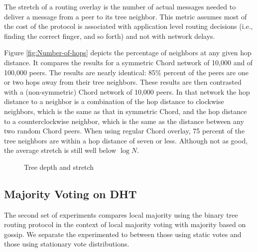 \documentclass[12pt,english,journal]{elsarticle}
\numberwithin{equation}{section}
\numberwithin{figure}{section}
\theoremstyle{plain}
\theoremstyle{plain}
\begin{document}
The stretch of a routing overlay is the number of actual messages
needed to deliver a message from a peer to its tree neighbor. This
metric assumes most of the cost of the protocol is associated with
application level routing decisions (i.e., finding the correct finger,
and so forth) and not with network delays. 

Figure \ref{fig:Number-of-hops} depicts the percentage of neighbors
at any given hop distance. It compares the results for a symmetric
Chord network of 10,000 and of 100,000 peers. The results are nearly
identical: 85\% percent of the peers are one or two hops away from
their tree neighbors. These results are then contrasted with a (non-symmetric)
Chord network of 10,000 peers. In that network the hop distance to
a neighbor is a combination of the hop distance to clockwise neighbors,
which is the same as that in symmetric Chord, and the hop distance
to a counterclockwise neighbor, which is the same as the distance
between any two random Chord peers. When using regular Chord overlay,
75 percent of the tree neighbors are within a hop distance of seven
or less. Although not as good, the average stretch is still well below
$\log N$. 

\begin{figure*}[p]
\caption{Tree depth and stretch}


\begin{minipage}[t]{0.5\textwidth}\end{minipage}\begin{minipage}[t]{0.5\textwidth}\end{minipage}

\end{figure*}



\subsection{Majority Voting on DHT}

The second set of experiments compares local majority using the binary
tree routing protocol in the context of local majority voting with
majority based on gossip. We separate the experimented to between
those using static votes and those using stationary vote distributions. 
\end{document}
